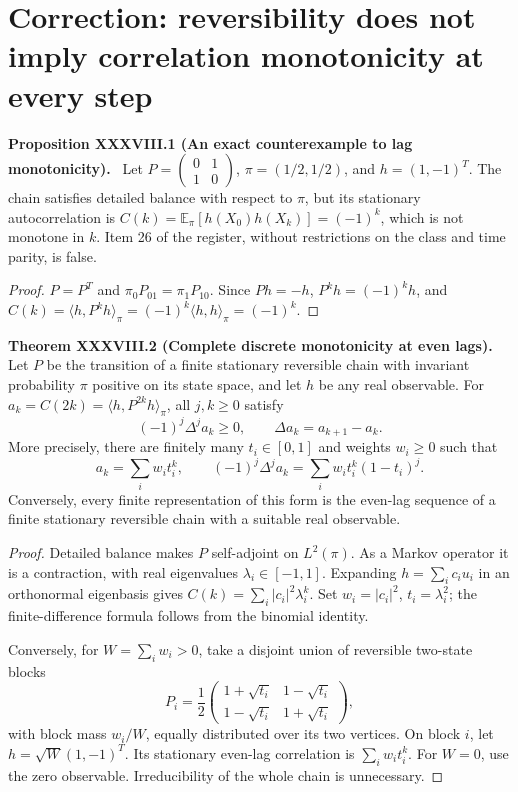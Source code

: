\documentclass[11pt,a4paper,oneside]{book}
\newcommand{\statement}[3]{\par\medskip\noindent\textbf{#1 #2 (#3).}\ }
\begin{document}
\section{Correction: reversibility does not imply correlation monotonicity at every step}
\statement{Proposition}{XXXVIII.1}{An exact counterexample to lag monotonicity}
Let $P=\left(\begin{smallmatrix}0&1\\1&0\end{smallmatrix}\right)$, $\pi=(1/2,1/2)$, and $h=(1,-1)^T$. The chain satisfies detailed balance with respect to $\pi$, but its stationary autocorrelation is $C(k)=\mathbb E_\pi[h(X_0)h(X_k)]=(-1)^k$, which is not monotone in $k$. Item 26 of the register, without restrictions on the class and time parity, is false.
\begin{proof}
$P=P^T$ and $\pi_0P_{01}=\pi_1P_{10}$. Since $Ph=-h$, $P^kh=(-1)^kh$, and $C(k)=\langle h,P^kh\rangle_\pi=(-1)^k\langle h,h\rangle_\pi=(-1)^k$.
\end{proof}
\statement{Theorem}{XXXVIII.2}{Complete discrete monotonicity at even lags}
Let $P$ be the transition of a finite stationary reversible chain with invariant probability $\pi$ positive on its state space, and let $h$ be any real observable. For $a_k=C(2k)=\langle h,P^{2k}h\rangle_\pi$, all $j,k\ge0$ satisfy
\begin{equation}(-1)^j\Delta^ja_k\ge0,\qquad\Delta a_k=a_{k+1}-a_k.\tag{142}\end{equation}
More precisely, there are finitely many $t_i\in[0,1]$ and weights $w_i\ge0$ such that
\begin{equation}a_k=\sum_iw_it_i^k,\qquad(-1)^j\Delta^ja_k=\sum_iw_it_i^k(1-t_i)^j.\tag{143}\end{equation}
Conversely, every finite representation of this form is the even-lag sequence of a finite stationary reversible chain with a suitable real observable.
\begin{proof}
Detailed balance makes $P$ self-adjoint on $L^2(\pi)$. As a Markov operator it is a contraction, with real eigenvalues $\lambda_i\in[-1,1]$. Expanding $h=\sum_ic_iu_i$ in an orthonormal eigenbasis gives $C(k)=\sum_i|c_i|^2\lambda_i^k$. Set $w_i=|c_i|^2$, $t_i=\lambda_i^2$; the finite-difference formula follows from the binomial identity.

Conversely, for $W=\sum_iw_i>0$, take a disjoint union of reversible two-state blocks
\[P_i=\frac12\begin{pmatrix}1+\sqrt{t_i}&1-\sqrt{t_i}\\1-\sqrt{t_i}&1+\sqrt{t_i}\end{pmatrix},\]
with block mass $w_i/W$, equally distributed over its two vertices. On block $i$, let $h=\sqrt W(1,-1)^T$. Its stationary even-lag correlation is $\sum_iw_it_i^k$. For $W=0$, use the zero observable. Irreducibility of the whole chain is unnecessary.
\end{proof}
\end{document}
